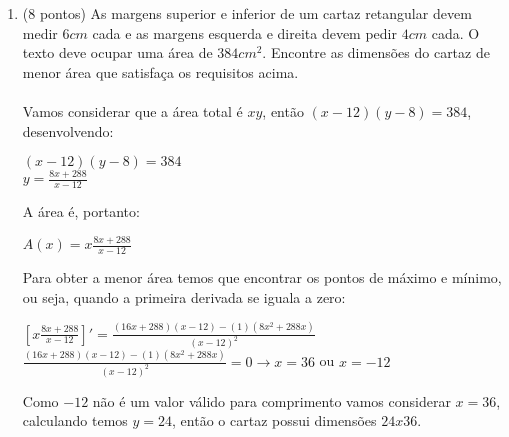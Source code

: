 \documentclass[12pt]{article}
\begin{document}
\begin{enumerate}
	
	\item (8 pontos) As margens superior e inferior de um cartaz retangular devem medir $6cm$ cada e as margens esquerda e direita devem pedir $4cm$ cada. O texto deve ocupar uma área de $384cm^2$. Encontre as dimensões do cartaz de menor área que satisfaça os requisitos acima.
	\\
	\\
	Vamos considerar que a área total é $xy$, então $(x-12)(y-8)=384$, desenvolvendo:
	\begin{center}
		$(x-12)(y-8)=384$\\
		$y= \frac{8x+288}{x-12}$
	\end{center}
	A área é, portanto:
	\begin{center}
		$A(x) = x\frac{8x+288}{x-12}$
	\end{center}
	Para obter a menor área temos que encontrar os pontos de máximo e mínimo, ou seja, quando a primeira derivada se iguala a zero:
	\begin{center}
		$\left[  x\frac{8x+288}{x-12} \right]' = \frac{(16x+288)(x-12)-(1)(8x^2+288x)}{(x-12)^2}$\\
		
		$ \frac{(16x+288)(x-12)-(1)(8x^2+288x)}{(x-12)^2} = 0 \rightarrow x = 36$ ou $x = -12$\\
	\end{center}
	Como $-12$ não é um valor válido para comprimento vamos considerar $x=36$, calculando temos $y=24$, então o cartaz possui dimensões $24x36$.
	
\end{enumerate}
\end{document}
